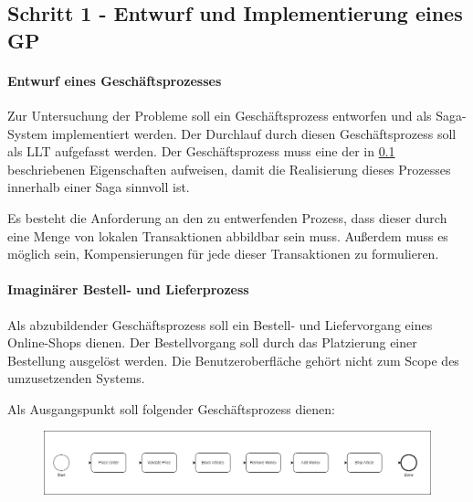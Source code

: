 \subsection{Schritt 1 - Entwurf und Implementierung eines GP}


\paragraph*{Entwurf eines Geschäftsprozesses}

Zur Untersuchung der Probleme soll ein Geschäftsprozess entworfen und als Saga-System implementiert werden. Der Durchlauf durch diesen Geschäftsprozess soll als LLT aufgefasst werden. Der Geschäftsprozess muss eine der in \ref{} beschriebenen Eigenschaften aufweisen, damit die Realisierung dieses Prozesses innerhalb einer Saga sinnvoll ist.  

Es besteht die Anforderung an den zu entwerfenden Prozess, dass dieser durch eine Menge von lokalen Transaktionen abbildbar sein muss. Außerdem muss es möglich sein, Kompensierungen für jede dieser Transaktionen zu formulieren. 

\paragraph*{Imaginärer Bestell- und Lieferprozess}

Als abzubildender Geschäftsprozess soll ein Bestell- und Liefervorgang eines Online-Shops dienen. Der Bestellvorgang soll durch das Platzierung einer Bestellung ausgelöst werden. Die Benutzeroberfläche gehört nicht zum Scope des umzusetzenden Systems. 

Als Ausgangspunkt soll folgender Geschäftsprozess dienen:

\begin{figure}[h!]
	\includegraphics[width=\linewidth]{figures/SimplifiedBusinessProcess.png}
\end{figure}



